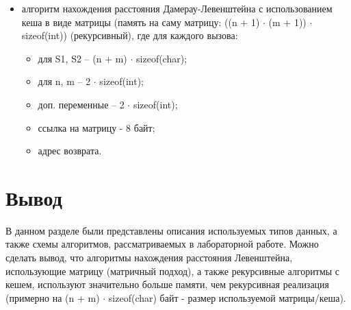 \begin{itemize}
    \item алгоритм нахождения расстояния Дамерау-Левенштейна с использованием кеша в виде матрицы (память на саму матрицу: ((n + 1) $ \cdot$ (m + 1)) $ \cdot$ sizeof(int)) (рекурсивный), где для каждого вызова:

    \begin{itemize}
        \item для S1, S2 -- (n + m) $ \cdot$ sizeof(char);
        \item для n, m -- 2 $ \cdot$ sizeof(int);
        \item доп. переменные -- 2 $ \cdot$ sizeof(int);
        \item ссылка на матрицу - 8 байт;
        \item адрес возврата.
    \end{itemize}

\end{itemize}

\section{Вывод}
В данном разделе были представлены описания используемых типов данных, а также схемы алгоритмов, рассматриваемых в лабораторной работе. 
Можно сделать вывод, что алгоритмы нахождения расстояния Левенштейна, использующие матрицу (матричный подход), а также рекурсивные алгоритмы с кешем, используют значительно больше памяти, чем рекурсивная реализация (примерно на  (n + m) $ \cdot$ sizeof(char) байт - размер используемой матрицы/кеша).
